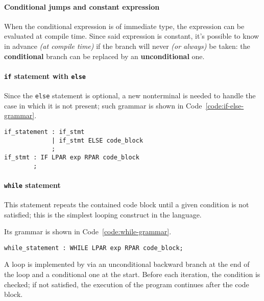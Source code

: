 \paragraph*{Conditional jumps and constant expression}

When the conditional expression is of immediate type, the expression can be evaluated at compile time.
Since said expression is constant, it's possible to know in advance \textit{(at compile time)} if the branch will never \textit{(or always)} be taken: the \textbf{conditional} branch can be replaced by an \textbf{unconditional} one.

\paragraph{\texttt{if} statement with \texttt{else}}

Since the \texttt{else} statement is optional, a new nonterminal is needed to handle the case in which it is not present;
such grammar is shown in Code~\ref{code:if-else-grammar}.

\begin{onepage}
  \begin{lstlisting}[language=LANCE, caption={Grammar for the if statement with else}, label={code:if-else-grammar}]
if_statement : if_stmt
             | if_stmt ELSE code_block
             ;
if_stmt : IF LPAR exp RPAR code_block
        ;
\end{lstlisting}
\end{onepage}

\paragraph{\texttt{while} statement}

This statement repeats the contained code block until a given condition is not satisfied;
this is the simplest looping construct in the language.

Its grammar is shown in Code~\ref{code:while-grammar}.

\begin{onepage}
  \begin{lstlisting}[language=LANCE, caption={Grammar for the while statement}, label={code:while-grammar}]
while_statement : WHILE LPAR exp RPAR code_block;
\end{lstlisting}
\end{onepage}

A loop is implemented by via an unconditional backward branch at the end of the loop and a conditional one at the start.
Before each iteration, the condition is checked; if not satisfied, the execution of the program continues after the code block.

